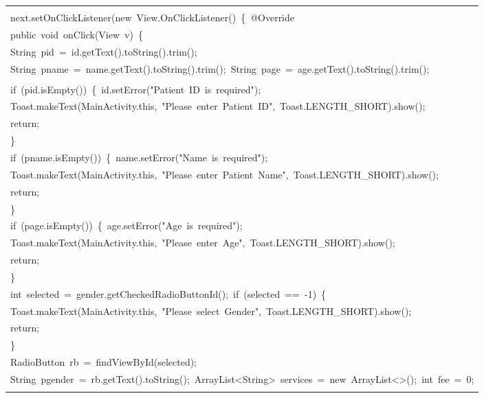 \documentclass[a4paper,12pt]{article}
\begin{document}
\begin{longtable}{|p{}|}
\strut \\
{\ttfamily\small next.setOnClickListener(new\ View.OnClickListener()\ \{\ @Override} \\
{\ttfamily\small public\ void\ onClick(View\ v)\ \{} \\
{\ttfamily\small String\ pid\ =\ id.getText().toString().trim();} \\
{\ttfamily\small String\ pname\ =\ name.getText().toString().trim();\ String\ page\ =\ age.getText().toString().trim();} \\
\strut \\
{\ttfamily\small if\ (pid.isEmpty())\ \{\ id.setError("Patient\ ID\ is\ required");} \\
{\ttfamily\small Toast.makeText(MainActivity.this,\ "Please\ enter\ Patient\ ID",\ Toast.LENGTH\_SHORT).show();} \\
{\ttfamily\small return;} \\
{\ttfamily\small \}} \\
{\ttfamily\small if\ (pname.isEmpty())\ \{\ name.setError("Name\ is\ required");} \\
{\ttfamily\small Toast.makeText(MainActivity.this,\ "Please\ enter\ Patient\ Name",\ Toast.LENGTH\_SHORT).show();} \\
{\ttfamily\small return;} \\
{\ttfamily\small \}} \\
{\ttfamily\small if\ (page.isEmpty())\ \{\ age.setError("Age\ is\ required");} \\
{\ttfamily\small Toast.makeText(MainActivity.this,\ "Please\ enter\ Age",\ Toast.LENGTH\_SHORT).show();} \\
{\ttfamily\small return;} \\
{\ttfamily\small \}} \\
{\ttfamily\small int\ selected\ =\ gender.getCheckedRadioButtonId();\ if\ (selected\ ==\ -1)\ \{} \\
{\ttfamily\small Toast.makeText(MainActivity.this,\ "Please\ select\ Gender",\ Toast.LENGTH\_SHORT).show();} \\
{\ttfamily\small return;} \\
{\ttfamily\small \}} \\
{\ttfamily\small RadioButton\ rb\ =\ findViewById(selected);} \\
{\ttfamily\small String\ pgender\ =\ rb.getText().toString();\ ArrayList\textless{}String\textgreater{}\ services\ =\ new\ ArrayList\textless{}\textgreater{}();\ int\ fee\ =\ 0;} \\
\strut \\

\end{longtable}
\end{document}

